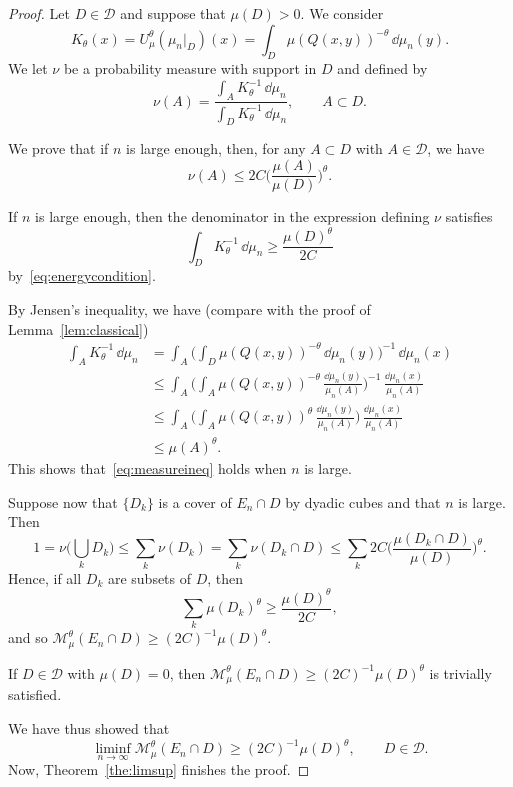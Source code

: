\begin{proof}
Let $D \in \mathscr{D}$ and suppose that $\mu (D) > 0$. We consider
\[
K_\theta (x) = U_\mu^\theta (\mu_n|_D) (x) = \int_D \mu (Q(x,y))^{-\theta} \, \dd \mu_n (y).
\]
We let $\nu$ be a probability measure with support in $D$ and defined by
\[
\nu (A) = \frac{\int_A K_\theta^{-1} \, \dd \mu_n}{\int_D K_\theta^{-1} \, \dd \mu_n}, \qquad A \subset D.
\]

We prove that if $n$ is large enough, then, for any $A \subset D$ with $A \in \mathscr{D}$, we have
\begin{equation}\label{eq:measureineq}
\nu (A) \leq 2 C \biggl(\frac{\mu (A)}{\mu (D)} \biggr)^\theta.
\end{equation}

If $n$ is large enough, then the denominator in the expression defining $\nu$ satisfies
\[
\int_D K_\theta^{-1} \, \dd \mu_n \geq
\frac{\mu(D)^\theta}{2C}
\]
by~\eqref{eq:energycondition}.

By Jensen's inequality, we have (compare with the proof of Lemma~\ref{lem:classical})
\begin{align*}
\int_A K_\theta^{-1} \, \dd \mu_n & = \int_A \biggl(\int_D
\mu (Q(x,y))^{-\theta} \, \dd \mu_n (y) \biggr)^{-1} \,
\dd \mu_n (x) \\ &\leq \int_A \biggl(\int_A \mu (Q(x,y))^{-\theta} \, \frac{\dd \mu_n (y)}{\mu_n (A)}
\biggr)^{-1} \, \frac{\dd \mu_n (x)}{\mu_n (A)} \\ &\leq
\int_A \biggl(\int_A \mu (Q(x,y))^{\theta} \, \frac{\dd
\mu_n (y)}{\mu_n (A)} \biggr) \, \frac{\dd \mu_n (x)}{\mu_n (A)} \\ &\leq \mu (A)^\theta.
\end{align*}
This shows that~\eqref{eq:measureineq} holds when $n$ is large.

Suppose now that $\{D_k\}$ is a cover of $E_n \cap D$ by dyadic cubes and that $n$ is large. Then
\[
1 = \nu \biggl(\bigcup_k D_k \biggr) \leq \sum_k \nu (D_k) = \sum_k
\nu (D_k \cap D) \leq \sum_k 2 C \biggl(\frac{\mu (D_k \cap D)}{\mu (D)} \biggr)^\theta.
\]
Hence, if all $D_k$ are subsets of $D$, then
\[
\sum_k \mu(D_k)^\theta \geq \frac{\mu (D)^\theta}{2 C},
\]
and so $\mathscr{M}_\mu^\theta (E_n \cap D) \geq (2C)^{-1} \mu (D)^\theta$.

If $D \in \mathscr{D}$ with $\mu (D) = 0$, then $\mathscr{M}_\mu^\theta (E_n \cap D) \geq (2C)^{-1} \mu (D)^\theta$ is trivially satisfied.

We have thus showed that
\[
\liminf_{n \to \infty} \mathscr{M}_\mu^\theta (E_n \cap D) \geq (2C)^{-1} \mu (D)^\theta, \qquad D \in \mathscr{D}.
\]
Now, Theorem~\ref{the:limsup} finishes the proof.
\end{proof}

